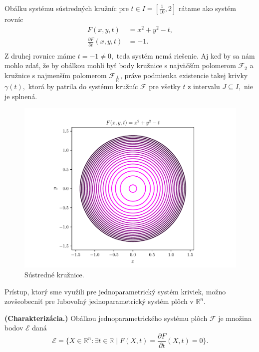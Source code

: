 \begin{example} 
Obálku systému sústredných kružníc pre $t \in I=[\frac{1}{10},2]$ rátame ako systém rovníc
\begin{align*}
F(x, y, t) &= x^2 + y^2 - t, \\
\frac{\partial F}{\partial t}(x,y,t) &= -1. \\
\end{align*}
Z druhej rovnice máme $t=-1 \neq 0,$ teda systém nemá riešenie. Aj keď by sa nám mohlo zdať, že by obálkou mohli byť body kružnice s najväčším polomerom $\mathcal{F}_2$ a kružnice s najmenším polomerom $\mathcal{F}_{\frac{1}{10}}$, práve podmienka existencie takej krivky $\gamma(t),$ ktorá by patrila do systému kružníc $\mathcal{F}$ pre všetky $t$ z intervalu $J \subseteq  I, $ nie je splnená.
\end{example}

\begin{figure}[H]
	\centering
	\includegraphics[trim={0 0.35cm 0 0.85cm},clip]{images/concentric_circles.pdf}
	\caption{Sústredné kružnice.}
	\label{fig:concentric_circles}
\end{figure}

Prístup, ktorý sme využili pre jednoparametrický systém kriviek, možno zovšeobecniť pre ľubovoľný jednoparametrický systém plôch v $\mathbb{R}^n.$

\begin{definition}{\textbf{\textup{(Charakterizácia.)}}}
\label{charakterizacia}
Obálkou jednoparametrického systému plôch $ \mathcal{F} $ je množina bodov $\mathcal{E}$ daná
$$\mathcal{E} = \{ X \in \mathbb{R}^{n} \colon \exists t \in \mathbb{R} \mid F(X, t) = \frac{\partial F}{\partial t}(X, t) = 0 \}.$$
\end{definition}

